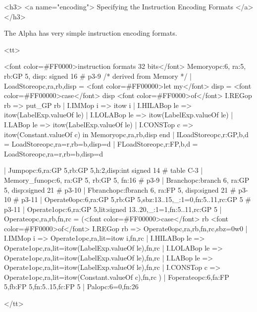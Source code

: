 <h3> <a name="encoding">
     Specifying the Instruction Encoding Formats </a></h3>

    The Alpha has very simple instruction encoding formats.

<tt>
\begin{SML}
   <font color=#FF0000>instruction formats 32 bits</font>
     Memory{opc:6, ra:5, rb:GP 5, disp: signed 16} #  p3-9 
      /* derived from Memory */ 
   | LoadStore{opc,ra,rb,disp} =
       <font color=#FF00000>let my</font> disp = 
           <font color=#FF00000>case</font> disp <font color=#FF0000>of</font>
             I.REGop rb => put_GP rb
           | I.IMMop i  => itow i
           | I.HILABop le => itow(LabelExp.valueOf le)
           | I.LOLABop le => itow(LabelExp.valueOf le)
           | I.LABop le => itow(LabelExp.valueOf le)
           | I.CONSTop c => itow(Constant.valueOf c)
       in  Memory{opc,ra,rb,disp}
       end
   | ILoadStore{opc,r:GP,b,d} = LoadStore{opc,ra=r,rb=b,disp=d}
   | FLoadStore{opc,r:FP,b,d} = LoadStore{opc,ra=r,rb=b,disp=d}

   | Jump{opc:6,ra:GP 5,rb:GP 5,h:2,disp:int signed 14}   #  table C-3 
   | Memory_fun{opc:6, ra:GP 5, rb:GP 5, fn:16}     #  p3-9 
   | Branch{opc:branch 6, ra:GP 5, disp:signed 21}           #  p3-10 
   | Fbranch{opc:fbranch 6, ra:FP 5, disp:signed 21}          #  p3-10 
        #  p3-11 
   | Operate0{opc:6,ra:GP 5,rb:GP 5,sbz:13..15,_:1=0,fn:5..11,rc:GP 5} 
        #  p3-11 
   | Operate1{opc:6,ra:GP 5,lit:signed 13..20,_:1=1,fn:5..11,rc:GP 5} 
   | Operate{opc,ra,rb,fn,rc} =
        (<font color=#FF00000>case</font> rb <font color=#FF0000>of</font>
          I.REGop rb => Operate0{opc,ra,rb,fn,rc,sbz=0w0}
        | I.IMMop i  => Operate1{opc,ra,lit=itow i,fn,rc}
        | I.HILABop le => Operate1{opc,ra,lit=itow(LabelExp.valueOf le),fn,rc}
        | I.LOLABop le => Operate1{opc,ra,lit=itow(LabelExp.valueOf le),fn,rc}
        | I.LABop le => Operate1{opc,ra,lit=itow(LabelExp.valueOf le),fn,rc}
        | I.CONSTop c => Operate1{opc,ra,lit=itow(Constant.valueOf c),fn,rc}
        )
   | Foperate{opc:6,fa:FP 5,fb:FP 5,fn:5..15,fc:FP 5}
   | Pal{opc:6=0,fn:26}
\end{SML}
</tt>


